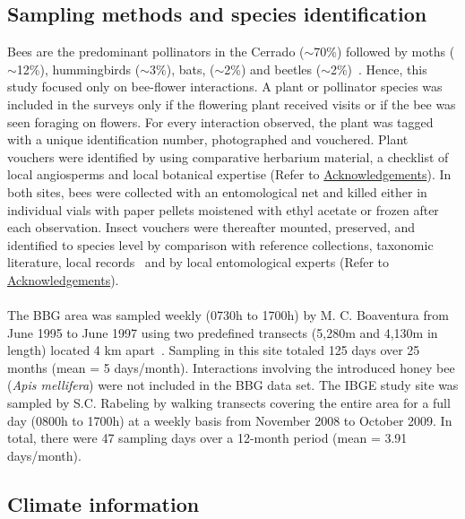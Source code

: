 \documentclass[11pt]{article}
\begin{document}
\subsection{Sampling methods and species identification}
Bees are the predominant pollinators in the Cerrado ($\sim$70\%) followed by moths ($\sim$12\%), hummingbirds ($\sim$3\%), bats, ($\sim$2\%) and beetles ($\sim$2\%)~\citep{Oliveira2002, Gottsberger2006a, Cappellari2011}. Hence, this study focused only on bee-flower interactions. A plant or pollinator species was included in the surveys only if the flowering plant received visits or if the bee was seen foraging on flowers. For every interaction observed, the plant was tagged with a unique identification number, photographed and vouchered. Plant vouchers were identified by using comparative herbarium material, a checklist of local angiosperms and local botanical expertise (Refer to \hyperref[sec: acknowledgements]{Acknowledgements}).  In both sites, bees were collected with an entomological net and killed either in individual vials with paper pellets moistened with ethyl acetate or frozen after each observation. Insect vouchers were thereafter mounted, preserved, and identified to species level by comparison with reference collections, taxonomic literature, local records~\citep{Moure1962, Silveira2002, Michener2007, Moure2007} and by local entomological experts (Refer to \hyperref[sec: acknowledgements]{Acknowledgements}). \\
\\
The BBG area was sampled weekly (0730h to 1700h) by M. C. Boaventura from June 1995 to June 1997 using two predefined transects (5,280m and 4,130m in length) located 4 km apart~\citep{Boaventura1998}. Sampling in this site totaled 125 days over 25 months (mean = 5 days/month). Interactions involving the introduced honey bee (\textit{Apis mellifera}) were not included in the BBG data set. The IBGE study site was sampled by S.C. Rabeling by walking transects covering the entire area for a full day (0800h to 1700h) at a weekly basis from November 2008 to October 2009. In total, there were 47 sampling days over a 12-month period (mean = 3.91 days/month). 

\subsection{Climate information}
\end{document}
